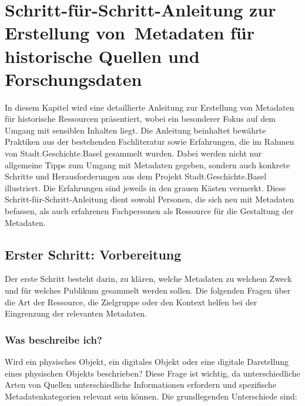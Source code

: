 \documentclass[
  letterpaper,
  DIV=11,
  numbers=noendperiod]{scrartcl}
\begin{document}
\section{Schritt-für-Schritt-Anleitung zur Erstellung von~Metadaten für
historische Quellen und
Forschungsdaten}\label{sec-Schritt-fuxfcr-Schritt-Anleitung}

In diesem Kapitel wird eine detaillierte Anleitung zur Erstellung von
Metadaten für historische Ressourcen präsentiert, wobei ein besonderer
Fokus auf dem Umgang mit sensiblen Inhalten liegt. Die Anleitung
beinhaltet bewährte Praktiken aus der bestehenden Fachliteratur sowie
Erfahrungen, die im Rahmen von Stadt.Geschichte.Basel gesammelt wurden.
Dabei werden nicht nur allgemeine Tipps zum Umgang mit Metadaten
gegeben, sondern auch konkrete Schritte und Herausforderungen aus dem
Projekt Stadt.Geschichte.Basel illustriert. Die Erfahrungen sind jeweils
in den grauen Kästen vermerkt. Diese Schritt-für-Schritt-Anleitung dient
sowohl Personen, die sich neu mit Metadaten befassen, als auch
erfahrenen Fachpersonen als Ressource für die Gestaltung der Metadaten.

\subsection{Erster Schritt:
Vorbereitung}\label{erster-schritt-vorbereitung}

Der erste Schritt besteht darin, zu klären, welche Metadaten zu welchem
Zweck und für welches Publikum gesammelt werden sollen. Die folgenden
Fragen über die Art der Ressource, die Zielgruppe oder den Kontext
helfen bei der Eingrenzung der relevanten Metadaten.

\subsubsection{Was beschreibe ich?}\label{was-beschreibe-ich}

Wird ein physisches Objekt, ein digitales Objekt oder eine digitale
Darstellung eines physischen Objekts beschrieben? Diese Frage ist
wichtig, da unterschiedliche Arten von Quellen unterschiedliche
Informationen erfordern und spezifische Metadatenkategorien relevant
sein können. Die grundlegenden Unterschiede sind:
\end{document}
